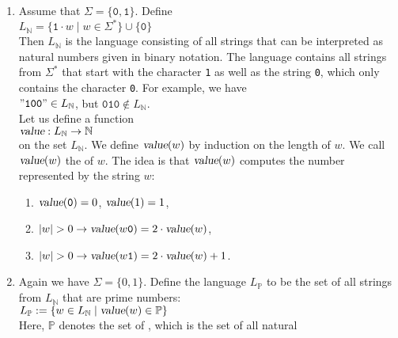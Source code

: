\examplesEng
\begin{enumerate}
\item Assume that $\Sigma = \{\mathtt{0},\mathtt{1}\}$.  Define
      \\[0.2cm]
      \hspace*{1.3cm}
      $L_\mathbb{N} = \{ \mathtt{1} \cdot w \mid w \in \Sigma^* \} \cup \{ \mathtt{0} \}$
      \\[0.2cm]
      Then $L_\mathbb{N}$ is the language consisting of all strings that can be interpreted as
      natural numbers given in binary notation.  The language contains all strings from $\Sigma^*$  that start with 
      the character \texttt{1} as well as the string \texttt{0}, which only contains the character
      \texttt{0}.  For example, we have
      \\[0.2cm]
      \hspace*{1.3cm}
      $\mathtt{\symbol{34}100\symbol{34}} \in L_\mathbb{N}$, \quad but \quad $\mathtt{010} \not\in L_\mathbb{N}$.
      \\[0.2cm]
      Let us define a function 
      \\[0.2cm]
      \hspace*{1.3cm}
      $\textsl{value}: L_\mathbb{N} \rightarrow \mathbb{N}$
      \\[0.2cm]
      on the set $L_\mathbb{N}$.  We define $\textsl{value}(w)$ by induction on the length of $w$.
      We call $\textsl{value}(w)$ the  of $w$.  The idea is that
      $\textsl{value}(w)$ computes the number represented by the string $w$:
      \begin{enumerate}
      \item $\textsl{value}(\mathtt{0}) = 0$, $\textsl{value}(1) = 1$,
      \item $|w| > 0 \rightarrow \textsl{value}(w\mathtt{0}) = 2 \cdot \textsl{value}(w)   $,
      \item $|w| > 0 \rightarrow \textsl{value}(w\mathtt{1}) = 2 \cdot \textsl{value}(w) + 1$.
      \end{enumerate}
\item Again we have $\Sigma = \{0,1\}$. Define the language $L_\mathbb{P}$
      to be the set of all strings from $L_\mathbb{N}$ that are prime numbers:
      \\[0.2cm]
      \hspace*{1.3cm}
      $L_\mathbb{P} := \{ w \in L_\mathbb{N} \mid \textsl{value}(w) \in \mathbb{P} \}$
      \\[0.2cm]
      Here, $\mathbb{P}$ denotes the set of ,  which is the set of all natural

\end{enumerate}

